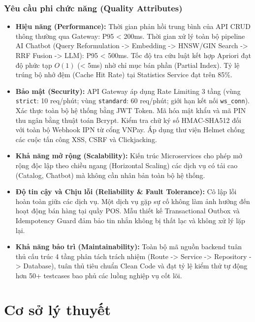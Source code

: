 \documentclass[12pt,a4paper]{report}
\begin{document}
\subsection{Yêu cầu phi chức năng (Quality Attributes)}
\begin{itemize}
    \item \textbf{Hiệu năng (Performance):} Thời gian phản hồi trung bình của API CRUD thông thường qua Gateway: P95 < 200ms. Thời gian xử lý toàn bộ pipeline AI Chatbot (Query Reformulation -> Embedding -> HNSW/GIN Search -> RRF Fusion -> LLM): P95 < 500ms. Tốc độ tra cứu luật kết hợp Apriori đạt độ phức tạp $O(1)$ (< 5ms) nhờ chỉ mục bán phần (Partial Index). Tỷ lệ trúng bộ nhớ đệm (Cache Hit Rate) tại Statistics Service đạt trên 85\%.
    \item \textbf{Bảo mật (Security):} API Gateway áp dụng Rate Limiting 3 tầng (vùng \texttt{strict}: 10 req/phút; vùng \texttt{standard}: 60 req/phút; giới hạn kết nối \texttt{ws\_conn}). Xác thực toàn bộ hệ thống bằng JWT Token. Mã hóa mật khẩu và mã PIN thu ngân bằng thuật toán Bcrypt. Kiểm tra chữ ký số HMAC-SHA512 đối với toàn bộ Webhook IPN từ cổng VNPay. Áp dụng thư viện Helmet chống các cuộc tấn công XSS, CSRF và Clickjacking.
    \item \textbf{Khả năng mở rộng (Scalability):} Kiến trúc Microservices cho phép mở rộng độc lập theo chiều ngang (Horizontal Scaling) các dịch vụ có tải cao (Catalog, Chatbot) mà không cần nhân bản toàn bộ hệ thống.
    \item \textbf{Độ tin cậy và Chịu lỗi (Reliability \& Fault Tolerance):} Cô lập lỗi hoàn toàn giữa các dịch vụ. Một dịch vụ gặp sự cố không làm ảnh hưởng đến hoạt động bán hàng tại quầy POS. Mẫu thiết kế Transactional Outbox và Idempotency Guard đảm bảo tin nhắn không bị thất lạc và không xử lý lặp lại.
    \item \textbf{Khả năng bảo trì (Maintainability):} Toàn bộ mã nguồn backend tuân thủ cấu trúc 4 tầng phân tách trách nhiệm (Route -> Service -> Repository -> Database), tuân thủ tiêu chuẩn Clean Code và đạt tỷ lệ kiểm thử tự động hơn 50+ testcases bao phủ các luồng nghiệp vụ cốt lõi.
\end{itemize}

\chapter{Cơ sở lý thuyết}
\end{document}
